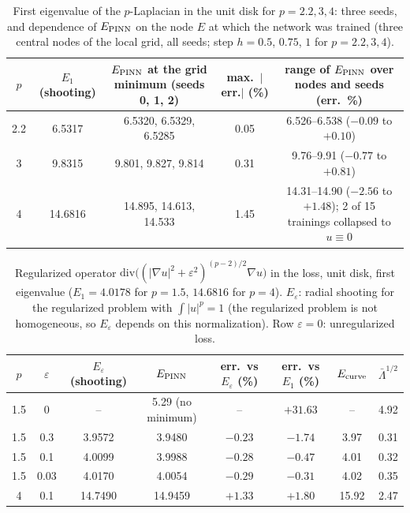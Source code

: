 \begin{table}[ht]
\centering
\begin{tabular}{ccccc}
\toprule
$p$ & $E_1$ (shooting) & $E_{\rm PINN}$ at the grid minimum (seeds 0, 1, 2) & max.\ $|$err.$|$ (\%) & range of $E_{\rm PINN}$ over nodes and seeds (err.\ \%) \\
\midrule
2.2 & 6.5317 & 6.5320, 6.5329, 6.5285 & 0.05 & 6.526--6.538 ($-0.09$ to $+0.10$) \\
3 & 9.8315 & 9.801, 9.827, 9.814 & 0.31 & 9.76--9.91 ($-0.77$ to $+0.81$) \\
4 & 14.6816 & 14.895, 14.613, 14.533 & 1.45 & 14.31--14.90 ($-2.56$ to $+1.48$); 2 of 15 trainings collapsed to $u\equiv0$ \\
\bottomrule
\end{tabular}
\caption{First eigenvalue of the $p$-Laplacian in the unit disk for $p=2.2,3,4$: three seeds, and dependence of $E_{\rm PINN}$ on the node $E$ at which the network was trained (three central nodes of the local grid, all seeds; step $h=0.5$, $0.75$, $1$ for $p=2.2,3,4$).}
\label{tab.plap.p.seeds}
\end{table}

\begin{table}[ht]
\centering
\begin{tabular}{cccccccc}
\toprule
$p$ & $\varepsilon$ & $E_\varepsilon$ (shooting) & $E_{\rm PINN}$ & err.\ vs $E_\varepsilon$ (\%) & err.\ vs $E_1$ (\%) & $E_{\rm curve}$ & $\bar\Lambda^{1/2}$ \\
\midrule
1.5 & 0 & -- & 5.29 (no minimum) & -- & $+31.63$ & -- & 4.92 \\
1.5 & 0.3 & 3.9572 & 3.9480 & $-0.23$ & $-1.74$ & 3.97 & 0.31 \\
1.5 & 0.1 & 4.0099 & 3.9988 & $-0.28$ & $-0.47$ & 4.01 & 0.32 \\
1.5 & 0.03 & 4.0170 & 4.0054 & $-0.29$ & $-0.31$ & 4.02 & 0.35 \\
4 & 0.1 & 14.7490 & 14.9459 & $+1.33$ & $+1.80$ & 15.92 & 2.47 \\
\bottomrule
\end{tabular}
\caption{Regularized operator $\mathrm{div}\big((|\nabla u|^2+\varepsilon^2)^{(p-2)/2}\nabla u\big)$ in the loss, unit disk, first eigenvalue ($E_1=4.0178$ for $p=1.5$, $14.6816$ for $p=4$). $E_\varepsilon$: radial shooting for the regularized problem with $\int|u|^p=1$ (the regularized problem is not homogeneous, so $E_\varepsilon$ depends on this normalization). Row $\varepsilon=0$: unregularized loss.}
\label{tab.plap.reg}
\end{table}

